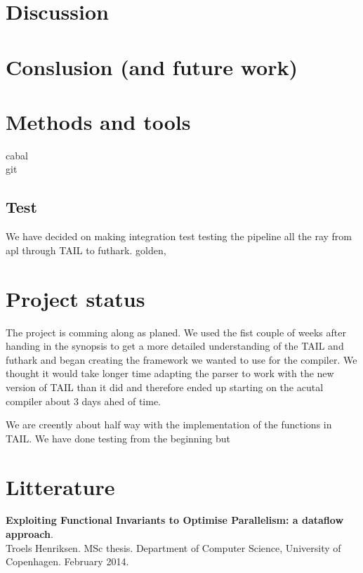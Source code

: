 \documentclass[11pt]{article}
\begin{document}
\section{Discussion}

\section{Conslusion (and future work)}

\section{Methods and tools}

cabal\\
git\\
\subsection{Test}
We have decided on making integration test testing the pipeline all the ray from apl through TAIL to futhark.
golden, \\

\section{Project status}
The project is comming along as planed. We used the fist couple of weeks after handing in the synopsis to get a more detailed understanding of the TAIL and futhark and began creating the framework we wanted to use for the compiler. 
We thought it would take longer time adapting the parser to work with the new version of TAIL than it did and therefore ended up starting on the acutal compiler about 3 days ahed of time. 

We are creently about half way with the implementation of the functions in TAIL. We have done testing from the beginning but 

\section{Litterature}
\begin{thebibliography}{widest entry}

   \textbf{Exploiting Functional Invariants to Optimise Parallelism: a dataflow approach}.\\ Troels Henriksen.  MSc thesis. Department of Computer Science, University of Copenhagen. February 2014.

\end{thebibliography}
\end{document}
